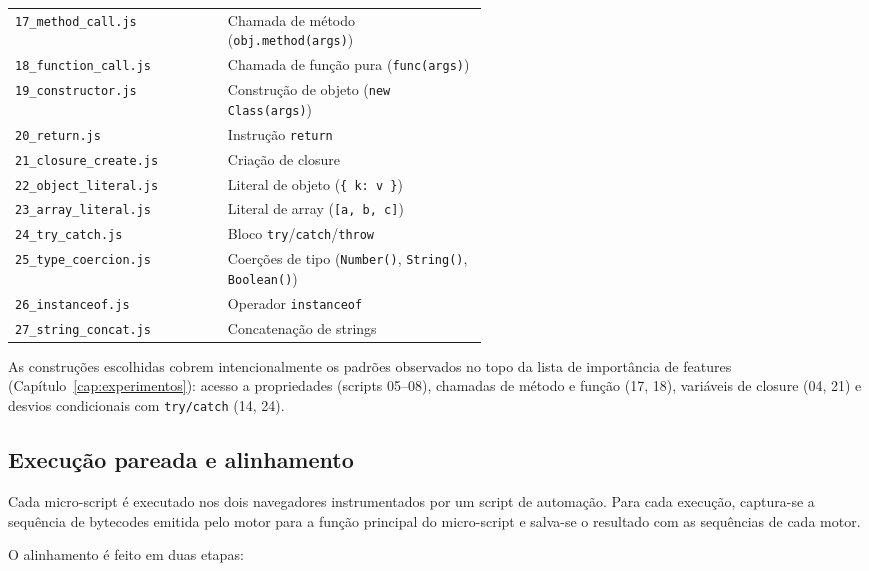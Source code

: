 \begin{longtable}{l p{0.55\linewidth}}
\texttt{17\_method\_call.js}   & Chamada de método (\texttt{obj.method(args)}) \\
\texttt{18\_function\_call.js} & Chamada de função pura (\texttt{func(args)}) \\
\texttt{19\_constructor.js}    & Construção de objeto (\texttt{new Class(args)}) \\
\texttt{20\_return.js}         & Instrução \texttt{return} \\
\texttt{21\_closure\_create.js}& Criação de closure \\
\texttt{22\_object\_literal.js}& Literal de objeto (\texttt{\{ k: v \}}) \\
\texttt{23\_array\_literal.js} & Literal de array (\texttt{[a, b, c]}) \\
\texttt{24\_try\_catch.js}     & Bloco \texttt{try}/\texttt{catch}/\texttt{throw} \\
\texttt{25\_type\_coercion.js} & Coerções de tipo (\texttt{Number()}, \texttt{String()}, \texttt{Boolean()}) \\
\texttt{26\_instanceof.js}     & Operador \texttt{instanceof} \\
\texttt{27\_string\_concat.js} & Concatenação de strings \\
\end{longtable}

As construções escolhidas cobrem intencionalmente os padrões observados no topo da
lista de importância de features (Capítulo~\ref{cap:experimentos}): acesso a
propriedades (scripts 05--08), chamadas de método e função (17, 18), variáveis de
closure (04, 21) e desvios condicionais com \texttt{try/catch} (14, 24).

\subsection{Execução pareada e alinhamento}
\label{sub:micro-exec}

Cada micro-script é executado nos dois navegadores instrumentados por um script
de automação. Para cada execução, captura-se a sequência de bytecodes emitida
pelo motor para a função principal do micro-script e salva-se o resultado com
as sequências de cada motor.

O alinhamento é feito em duas etapas:

